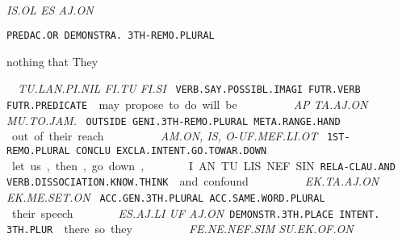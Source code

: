 {\is\ol~\es~\aj\on

{\it IS.OL		ES		AJ.ON	 }

{\tt PREDAC.OR	DEMONSTRA.	3TH-REMO.PLURAL }

nothing 	that		They 	 

\drie 

 
\tu\lan\Atlanpi\Atlannil~\Atlanfi\tu~\Atlanfi\si

{\it TU.LAN.PI.NIL		               FI.TU		FI.SI }

{\tt VERB.SAY.POSSIBL.IMAGI	FUTR.VERB	FUTR.PREDICATE }

may propose			to do		will be 
\drie 

  

\ap~\ta\aj\on~\Atlanmu\Atlanto\jam\period

{\it AP		TA.AJ.ON			MU.TO.JAM. }

{\tt OUTSIDE	GENI.3TH-REMO.PLURAL	META.RANGE.HAND }

out 		of their 				reach.
\drie

  
\am\on~\is~\Atlano\uf\mef\li\ot

{\it AM.ON,     IS,   O-UF.MEF.LI.OT				 }

{\tt 1ST-REMO.PLURAL CONCLU EXCLA.INTENT.GO.TOWAR.DOWN             }

let us, then, go down, 			      	 

\drie
 

\Atlani\an~\tu\lis\nef\Atlansin

I.AN			TU.LIS.NEF.SIN      

{\tt RELA-CLAU.AND	VERB.DISSOCIATION.KNOW.THINK }

and  			confound  

\drie

\ek\ta\aj\on~\ek\me\set\on

{\it EK.TA.AJ.ON		EK.ME.SET.ON }

{\tt ACC.GEN.3TH.PLURAL             ACC.SAME.WORD.PLURAL	 	}

their 			speech

\drie

  

\es\aj\lu~\uf~\aj\on

{\it ES.AJ.LI				UF		AJ.ON}				 
{\tt DEMONSTR.3TH.PLACE        INTENT.		3TH.PLUR	 }


there			so 			they 		

\drie

\fe\Atlanne\nef\Atlansim~\su\ek\of\on

{\it FE.NE.NEF.SIM			SU.EK.OF.ON	 }

}
